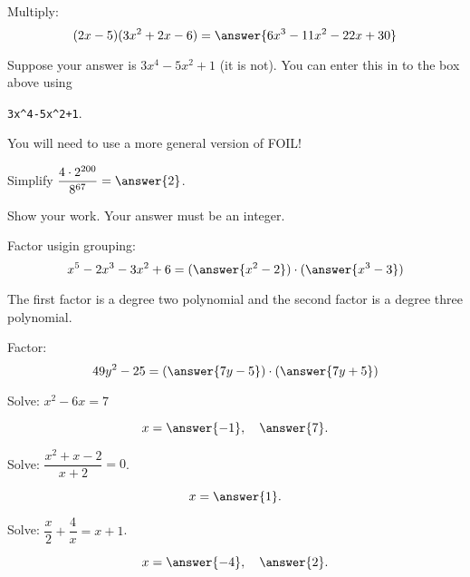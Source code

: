 \documentclass{ximera}
\begin{document}
\begin{problem}

Multiply: \hspace{1 cm} 
$$(2x -5)(3x^2 +2x -6)
=
\answer{6x^3-11x^2-22x+30}$$

\begin{hint}
\item Suppose your answer is $3x^4-5x^2+1$ (it is not). You can enter this in to the box above using

\hfill 
\verb|3x^4-5x^2+1|.
\hfill \,

\item You will need to use a more general version of FOIL!
\end{hint}



\end{problem}



\begin{problem}

Simplify $\dfrac{4\cdot 2^{200}}{8^{67}}=\answer{2}$.

Show your work. Your answer must be an integer. \\ 



\end{problem}



\begin{problem}

Factor usigin grouping:  
$$x^5 - 2 x^3 - 3x^2 +6
=
(\answer{x^2-2})\cdot(\answer{x^3-3})$$

The first factor is a degree two polynomial and the second factor is a degree three polynomial.


\end{problem}



\begin{problem}

Factor: 
$$49y^2 - 25
=
(\answer{7y-5})\cdot (\answer{7y+5})$$

\end{problem}



\begin{problem}

Solve: \hspace{1cm} $x^2 - 6x = 7$

$$x=\answer{-1},~~~ \answer{7}.$$


\end{problem}



\begin{problem}

Solve: \hspace{1cm} $\dfrac{x^2+x-2}{x+2}= 0$.


$$x=\answer{1}.$$
\end{problem}



\begin{problem}
Solve: \hspace{1cm} $\dfrac{x}{2}+\dfrac{4}{x}= x+1$.

$$x=\answer{-4}, ~~~ \answer{2}.$$

\end{problem}
\end{document}
